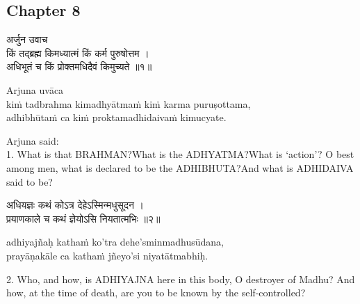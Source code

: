 \chapterdrop

\begin{center}

\headerspace
{}

\section{Chapter 8}

\headerspace
{}

\headerspace
{}

\headerspace
{}

\headerspace
\end{center}

\begin{gitaverse}
अर्जुन उवाच \\
किं तद्ब्रह्म किमध्यात्मं किं कर्म पुरुषोत्तम । \\
अधिभूतं च किं प्रोक्तमधिदैवं किमुच्यते ॥१॥
\end{gitaverse}

\begin{transliteration}
Arjuna uvāca \\
kiṁ tadbrahma kimadhyātmaṁ kiṁ karma puruṣottama, \\
adhibhūtaṁ ca kiṁ proktamadhidaivaṁ kimucyate.
\end{transliteration}

Arjuna said: \\
1. What is that BRAHMAN?\@ What is the ADHYATMA?\@ What is `action'? O best
among men, what is declared to be the ADHIBHUTA?\@ And what is ADHIDAIVA said
to be?

\begin{gitaverse}
अधियज्ञः कथं कोऽत्र देहेऽस्मिन्मधुसूदन । \\
प्रयाणकाले च कथं ज्ञेयोऽसि नियतात्मभिः ॥२॥
\end{gitaverse}

\begin{transliteration}
adhiyajñaḥ kathaṁ ko'tra dehe'sminmadhusūdana, \\
prayāṇakāle ca kathaṁ jñeyo'si niyatātmabhiḥ.
\end{transliteration}

2. Who, and how, is ADHIYAJNA here in this body, O destroyer of Madhu? And how,
at the time of death, are you to be known by the self-controlled?

